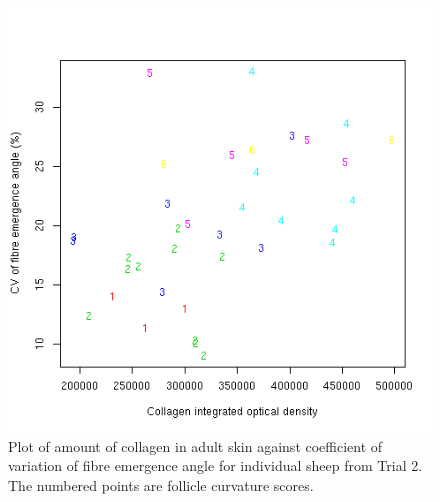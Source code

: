 %

\begin{figure}[!h]
  \centering
  \includegraphics[width=1.0\textwidth]{disrupt.png}
  \caption{Plot of amount of collagen in adult skin against coefficient of variation of fibre emergence angle for individual sheep from Trial 2. The numbered points are follicle curvature scores.}
  \label{fig:disrupt}
\end{figure}

%

